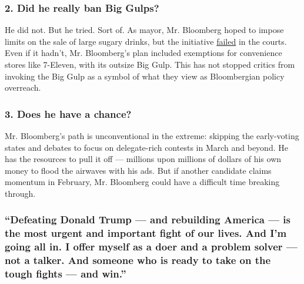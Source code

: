 \hypertarget{2-did-he-really-ban-big-gulps}{%
\subsubsection{\texorpdfstring{\textbf{2. Did he really ban Big
Gulps?}}{2. Did he really ban Big Gulps?}}\label{2-did-he-really-ban-big-gulps}}

He did not. But he tried. Sort of. As mayor, Mr. Bloomberg hoped to
impose limits on the sale of large sugary drinks, but the initiative
\href{https://www.nytimes.com/2014/06/27/nyregion/city-loses-final-appeal-on-limiting-sales-of-large-sodas.html}{failed}
in the courts. Even if it hadn't, Mr. Bloomberg's plan included
exemptions for convenience stores like 7-Eleven, with its outsize Big
Gulp. This has not stopped critics from invoking the Big Gulp as a
symbol of what they view as Bloombergian policy overreach.

\hypertarget{3-does-he-have-a-chance}{%
\subsubsection{\texorpdfstring{\textbf{3. Does he have a
chance?}}{3. Does he have a chance?}}\label{3-does-he-have-a-chance}}

Mr. Bloomberg's path is unconventional in the extreme: skipping the
early-voting states and debates to focus on delegate-rich contests in
March and beyond. He has the resources to pull it off --- millions upon
millions of dollars of his own money to flood the airwaves with his ads.
But if another candidate claims momentum in February, Mr. Bloomberg
could have a difficult time breaking through.

\hypertarget{defeating-donald-trump--and-rebuilding-america--is-the-most-urgent-and-important-fight-of-our-lives-and-im-going-all-in-i-offer-myself-as-a-doer-and-a-problem-solver--not-a-talker-and-someone-who-is-ready-to-take-on-the-tough-fights--and-win}{%
\subsubsection{``Defeating Donald Trump --- and rebuilding America ---
is the most urgent and important fight of our lives. And I'm going all
in. I offer myself as a doer and a problem solver --- not a talker. And
someone who is ready to take on the tough fights --- and
win.''}\label{defeating-donald-trump--and-rebuilding-america--is-the-most-urgent-and-important-fight-of-our-lives-and-im-going-all-in-i-offer-myself-as-a-doer-and-a-problem-solver--not-a-talker-and-someone-who-is-ready-to-take-on-the-tough-fights--and-win}}


